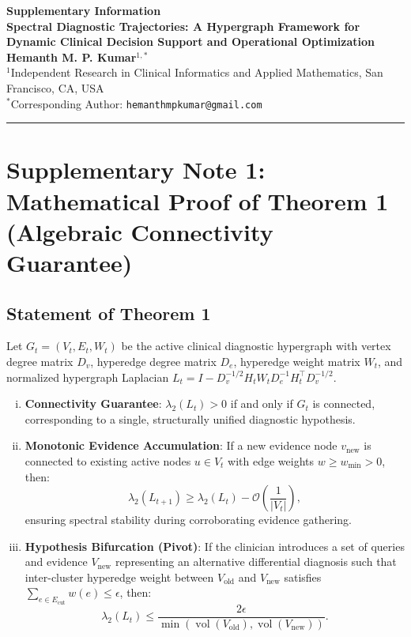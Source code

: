 \documentclass[11pt]{article}
\DeclareMathOperator{\vol}{vol}
\begin{document}
\begin{center}
  {\LARGE \textbf{Supplementary Information}}\\[12pt]
  {\Large \textbf{Spectral Diagnostic Trajectories: A Hypergraph Framework for Dynamic Clinical Decision Support and Operational Optimization}}\\[16pt]
  \textbf{Hemanth M. P. Kumar}$^{1,*}$\\[8pt]
  $^{1}${\small Independent Research in Clinical Informatics and Applied Mathematics, San Francisco, CA, USA}\\[4pt]
  $^{*}${\small Corresponding Author: \texttt{hemanthmpkumar@gmail.com}}
\end{center}

\vspace{0.8cm}
\hrule
\vspace{0.8cm}

\tableofcontents

\newpage

\section{Supplementary Note 1: Mathematical Proof of Theorem 1 (Algebraic Connectivity Guarantee)}

\subsection{Statement of Theorem 1}
Let $G_t = (V_t, E_t, W_t)$ be the active clinical diagnostic hypergraph with vertex degree matrix $D_v$, hyperedge degree matrix $D_e$, hyperedge weight matrix $W_t$, and normalized hypergraph Laplacian $L_t = I - D_v^{-1/2} H_t W_t D_e^{-1} H_t^\top D_v^{-1/2}$.
\begin{enumerate}[(i)]
  \item \textbf{Connectivity Guarantee}: $\lambda_2(L_t) > 0$ if and only if $G_t$ is connected, corresponding to a single, structurally unified diagnostic hypothesis.
  \item \textbf{Monotonic Evidence Accumulation}: If a new evidence node $v_{\text{new}}$ is connected to existing active nodes $u \in V_t$ with edge weights $w \ge w_{\min} > 0$, then:
  \begin{equation}
    \lambda_2(L_{t+1}) \ge \lambda_2(L_t) - \mathcal{O}\!\left(\frac{1}{|V_t|}\right),
  \end{equation}
  ensuring spectral stability during corroborating evidence gathering.
  \item \textbf{Hypothesis Bifurcation (Pivot)}: If the clinician introduces a set of queries and evidence $V_{\text{new}}$ representing an alternative differential diagnosis such that inter-cluster hyperedge weight between $V_{\text{old}}$ and $V_{\text{new}}$ satisfies $\sum_{e \in E_{\text{cut}}} w(e) \le \epsilon$, then:
  \begin{equation}
    \lambda_2(L_t) \le \frac{2 \epsilon}{\min(\vol(V_{\text{old}}), \vol(V_{\text{new}}))}.
  \end{equation}
\end{enumerate}
\end{document}
